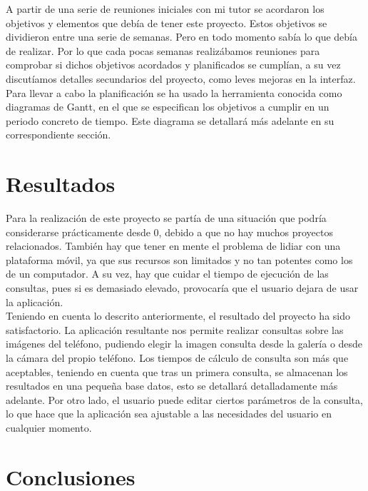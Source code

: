 A partir de una serie de reuniones iniciales con mi tutor se acordaron los objetivos y elementos que debía de tener este proyecto. Estos objetivos se dividieron entre una serie de semanas. Pero en todo momento sabía lo que debía de realizar. Por lo que cada pocas semanas realizábamos reuniones para comprobar si dichos objetivos acordados y planificados se cumplían, a su vez discutíamos detalles secundarios del proyecto, como leves mejoras en la interfaz.\\

Para llevar a cabo la planificación se ha usado la herramienta conocida como diagramas de Gantt, en el que se especifican los objetivos a cumplir en un periodo concreto de tiempo. Este diagrama se detallará más adelante en su correspondiente sección.\\

\section{Resultados}

Para la realización de este proyecto se partía de una situación que podría considerarse prácticamente desde 0, debido a que no hay muchos proyectos relacionados. También hay que tener en mente el problema de lidiar con una plataforma móvil, ya que sus recursos son limitados y no tan potentes como los de un computador. A su vez, hay que cuidar el tiempo de ejecución de las consultas, pues si es demasiado elevado, provocaría que el usuario dejara de usar la aplicación.\\

Teniendo en cuenta lo descrito anteriormente, el resultado del proyecto ha sido satisfactorio. La aplicación resultante nos permite realizar consultas sobre las imágenes del teléfono, pudiendo elegir la imagen consulta desde la galería o desde la cámara del propio teléfono. Los tiempos de cálculo de consulta son más que aceptables, teniendo en cuenta que tras un primera consulta, se almacenan los resultados en una pequeña base datos, esto se detallará detalladamente más adelante. Por otro lado, el usuario puede editar ciertos parámetros de la consulta, lo que hace que la aplicación sea ajustable a las necesidades del usuario en cualquier momento.\\

\section{Conclusiones}

